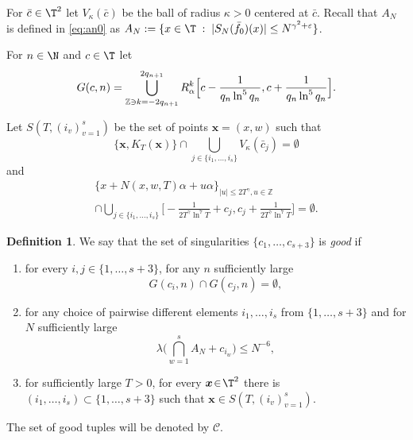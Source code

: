 \documentclass[JEP,XML,SOM,Unicode,NoFloatCountersInSection]{cedram}
\let\DS\relax
\newcommand\cC{\mathcal{C}}
\newcommand\cG{\mathcal{G}}
\newcommand\Z{\mathbb{Z}}
\newcommand\bx{\boldsymbol{x}}
\let\eps\varepsilon
\theoremstyle{definition}
\newtheorem{definition}{Definition}
\theoremstyle{plain}
\begin{document}
For $\bar{c}\in \T^2$ let $V_\kappa (\bar{c})$ be the ball of radius $\kappa>0$ centered at $\bar{c}$.
Recall that $A_N$ is defined in \eqref{eq:an0} as
$
\DS A_N:=\{x\in \T\;:\; |S_N(\bar{f}_0)(x)|\leq N^{\gamma^2+\eps}\}$.

For $n\in \N$ and $c\in \T$ let
\begin{equation}\label{eq:gcn}
G(c,n)= \bigcup_{\Z\ni k=-2q_{n+1}}^{2q_{n+1}}
R^k_\alpha\Bigl[c-\frac{1}{q_n\ln^{5}q_n}, c+\frac{1}{q_n\ln^{5}q_n}\Bigr].
\end{equation}

Let $S(T,(i_v)_{v=1}^s)$ be the set of points $\bx=(x, w)$ such that
\begin{equation}\label{eq:awaysing}
\{\bx, K_T(\bx)\}\cap \bigcup_{j\in \{i_1,\ldots,{i_s}\} }V_\kappa(\bar{c}_j)
{=\emptyset}
\end{equation}
and
\begin{multline}\label{eq:awaysing2}
\{x+N(x,w,T)\alpha+u\alpha\}_{|u|\leq 2T^\gamma, u\in \Z} \\
\cap
\bigcup_{j\in \{i_1,\ldots,{ i_s}\}} \Big[-\frac{1}{2T^\gamma\ln^{7}T}+ c_j, c_j+\frac{1}{2T^\gamma\ln^{7}T}\Big]
=\emptyset.
\end{multline}

\begin{definition} \label{def.good}
We say that the set of singularities $\{c_1,\ldots,c_{s+3}\}$ is {\it good} if
\begin{enumerate}\renewcommand{\theenumi}{$\cG$\arabic{enumi}}
\item\label{cG1}
for every $i,j \in \{1,\ldots, s+3\}$, for any $n$ sufficiently large
\[
G(c_i,n)\cap G(c_j,n)=\emptyset,
\]

\item\label{cG2}
for any choice of pairwise different elements $i_1,\ldots,i_s$ from $\{1,\ldots,s+3\}$ and for $N$ sufficiently large
\[
\lambda\Big(\bigcap_{w=1}^sA_N+c_{i_w}\Big)\leq N^{-6},
\]

\item\label{cG3}
for sufficiently large $T\!>\!0$, for every $\bx\!\in\! \T^2$ there is \hbox{$(i_1,\ldots,i_s)\!\subset\! \{1,\ldots,s+3\}$} such that $ \bx\in S(T,(i_v)_{v=1}^s)$.
\end{enumerate}
The set of good tuples will be denoted by $\cC$.
\end{definition}
\end{document}

